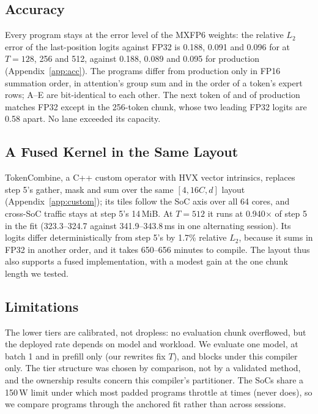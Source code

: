 \subsection{Accuracy}
\label{sec:eval-acc}

Every program stays at the error level of the MXFP6 weights: the relative $L_2$ error of the last-position logits against
FP32 is 0.188, 0.091 and 0.096 for \sys at $T=128$, 256 and 512, against 0.188, 0.089 and 0.095 for production
(Appendix~\ref{app:acc}). The programs differ from production only in FP16 summation order, in attention's group sum and in
the order of a token's expert rows; A--E are bit-identical to each other. The next token of \sys and of production
matches FP32 except in the 256-token chunk, whose two leading FP32 logits are 0.58 apart. No lane exceeded its capacity.

\subsection{A Fused Kernel in the Same Layout}
\label{sec:eval-kernel}

TokenCombine, a C++ custom operator with HVX vector intrinsics, replaces step 5's gather, mask and sum over the same
$[4,16C,d]$ layout (Appendix~\ref{app:custom}); its tiles follow the SoC axis over all 64 cores, and cross-SoC traffic stays
at step 5's 14\,MiB. At $T=512$ it runs at 0.940$\times$ of step 5
in the fit (323.3--324.7 against 341.9--343.8\,ms in one alternating session). Its logits differ deterministically from step
5's by 1.7\% relative $L_2$, because it sums in FP32 in another order, and it takes 650--656 minutes to compile. The layout
thus also supports a fused implementation, with a modest gain at the one chunk length we tested.

\subsection{Limitations}
\label{sec:limits}

The lower tiers are calibrated, not dropless: no evaluation chunk overflowed, but the deployed rate depends on model and
workload. We evaluate one model, at batch 1 and in prefill only (our rewrites fix $T$), and blocks under this compiler
only. The tier structure was chosen by comparison, not by a validated method,
and the ownership results concern this compiler's partitioner. The SoCs share a 150\,W limit under which most padded
programs throttle at times (\sys never does), so we compare programs through the anchored fit rather than across sessions.
